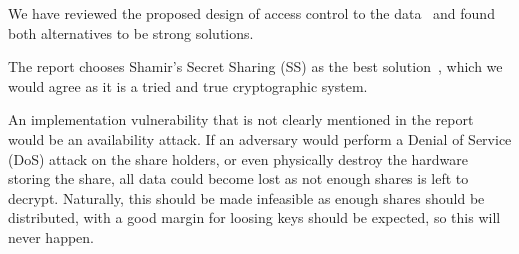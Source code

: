 
We have reviewed the proposed design of access control to the
data~\cite[sec. 3]{8} and found both alternatives to be strong
solutions.

The report chooses Shamir's Secret Sharing (SS) as the best
solution~\cite[p. 13]{8}, which we would agree as it is a tried and
true cryptographic system.

An implementation vulnerability that is not clearly mentioned in the
report would be an availability attack. If an adversary would perform
a Denial of Service (DoS) attack on the share holders, or even
physically destroy the hardware storing the share, all data could
become lost as not enough shares is left to decrypt. Naturally, this
should be made infeasible as enough shares should be distributed, with
a good margin for loosing keys should be expected, so this will never
happen.
